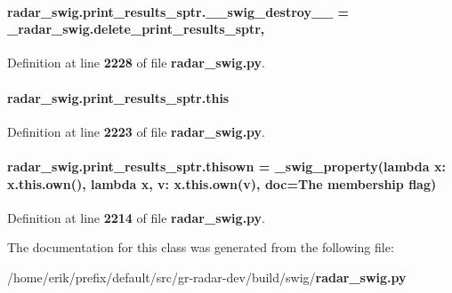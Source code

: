 \paragraph[{\+\_\+\+\_\+swig\+\_\+destroy\+\_\+\+\_\+}]{\setlength{\rightskip}{0pt plus 5cm}radar\+\_\+swig.\+print\+\_\+results\+\_\+sptr.\+\_\+\+\_\+swig\+\_\+destroy\+\_\+\+\_\+ = \+\_\+radar\+\_\+swig.\+delete\+\_\+print\+\_\+results\+\_\+sptr\hspace{0.3cm}{\ttfamily [static]}, {\ttfamily [private]}}\label{classradar__swig_1_1print__results__sptr_add7b3a2ed00fbe4a87f28bc8ace7eb9a}


Definition at line {\bf 2228} of file {\bf radar\+\_\+swig.\+py}.

\paragraph[{this}]{\setlength{\rightskip}{0pt plus 5cm}radar\+\_\+swig.\+print\+\_\+results\+\_\+sptr.\+this}\label{classradar__swig_1_1print__results__sptr_a9aaf36ef268ec8b4c4e1fcea50b786f0}


Definition at line {\bf 2223} of file {\bf radar\+\_\+swig.\+py}.

\paragraph[{thisown}]{\setlength{\rightskip}{0pt plus 5cm}radar\+\_\+swig.\+print\+\_\+results\+\_\+sptr.\+thisown = {\bf \+\_\+swig\+\_\+property}(lambda x\+: x.\+this.\+own(), lambda {\bf x}, v\+: x.\+this.\+own(v), doc=\textquotesingle{}The membership flag\textquotesingle{})\hspace{0.3cm}{\ttfamily [static]}}\label{classradar__swig_1_1print__results__sptr_a3234ef6eb3f58e01009efe3d67242bb4}


Definition at line {\bf 2214} of file {\bf radar\+\_\+swig.\+py}.



The documentation for this class was generated from the following file\+:\begin{DoxyCompactItemize}
\item 
/home/erik/prefix/default/src/gr-\/radar-\/dev/build/swig/{\bf radar\+\_\+swig.\+py}\end{DoxyCompactItemize}
